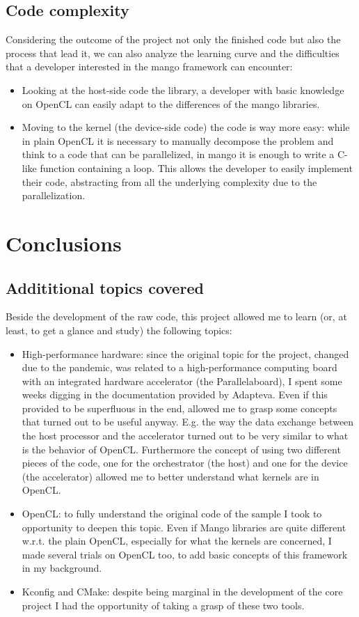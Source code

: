 \subsection{Code complexity}
Considering the outcome of the project not only the finished code but also the process that lead it, we can also analyze the learning curve and the difficulties that a developer interested in the mango framework can encounter:
\begin{itemize}
      \item Looking at the host-side code the library, a developer with basic knowledge on OpenCL can easily adapt to the differences of the mango libraries.
      \item Moving to the kernel (the device-side code) the code is way more easy: while in plain OpenCL it is necessary to manually decompose the problem and think to a code that can be parallelized, in mango it is enough to write a C-like function containing a loop. This allows the developer to easily implement their code, abstracting from all the underlying complexity due to the parallelization.
\end{itemize}


\section{Conclusions}
\subsection{Addititional topics covered}
Beside the development of the raw code, this project allowed me to learn (or, at least, to get a glance and study) the following topics:
\begin{itemize}
      \item High-performance hardware: since the original topic for the project, changed due to the pandemic, was related to a high-performance computing board with an integrated hardware accelerator (the Parallelaboard), I spent some weeks digging in the documentation provided by Adapteva.
      Even if this provided to be superfluous in the end, allowed me to grasp some concepts that turned out to be useful anyway. E.g. the way the data exchange between the host processor and the accelerator turned out to be very similar to what is the behavior of OpenCL. Furthermore the concept of using two different pieces of the code, one for the orchestrator (the host) and one for the device (the accelerator) allowed me to better understand what kernels are in OpenCL.
      \item OpenCL: to fully understand the original code of the sample I took to opportunity to deepen this topic. Even if Mango libraries are quite different w.r.t. the plain OpenCL, especially for what the kernels are concerned, I made several trials on OpenCL too, to add basic concepts of this framework in my background\cite{oclmanual}.
      \item Kconfig and CMake: despite being marginal in the development of the core project I had the opportunity of taking a grasp of these two tools.
\end{itemize}


